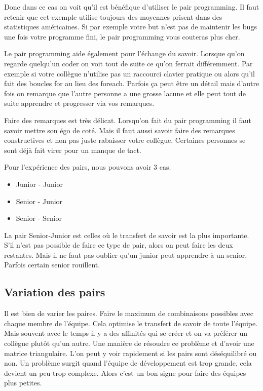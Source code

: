 \documentclass[journal, a4paper, frenchb]{IEEEtran}
\begin{document}
Donc dans ce cas on voit qu’il est bénéfique d’utiliser le pair programming. Il faut retenir que cet exemple utilise toujours des moyennes prisent dans des statistiques américaines. Si par exemple votre but n’est pas de maintenir les bugs une fois votre programme fini, le pair programming vous couteras plus cher.

Le pair programming aide également pour l’échange du savoir. Lorsque qu’on regarde quelqu’un coder on voit tout de suite ce qu’on ferrait différemment. Par exemple si votre collègue n’utilise pas un raccourci clavier pratique ou alors qu’il fait des boucles for au lieu des foreach. Parfois ça peut être un détail mais d’autre fois on remarque que l’autre personne a une grosse lacune et elle peut tout de suite apprendre et progresser via vos remarques.

Faire des remarques est très délicat. Lorsqu’on fait du pair programming il faut savoir mettre son égo de coté. Mais il faut aussi savoir faire des remarques constructives et non pas juste rabaisser votre collègue. Certaines personnes se sont déjà fait virer pour un manque de tact.

Pour l’expérience des pairs, nous pouvons avoir 3 cas.

\begin{itemize}
  \item Junior - Junior
  \item Senior - Junior
  \item Senior - Senior
\end{itemize}

La pair Senior-Junior est celles où le transfert de savoir est la plus importante. S’il n’est pas possible de faire ce type de pair, alors on peut faire les deux restantes. Mais il ne faut pas oublier qu’un junior peut apprendre à un senior. Parfois certain senior rouillent.

\subsection{Variation des pairs}

Il est bien de varier les paires. Faire le maximum de combinaisons possibles avec chaque membre de l’équipe. Cela optimise le transfert de savoir de toute l’équipe. Mais souvent avec le temps il y a des affinités qui se créer et on va préférer un collègue plutôt qu’un autre. Une manière de résoudre ce problème et d’avoir une matrice triangulaire. L’on peut y voir rapidement si les pairs sont déséquilibré ou non. Un problème surgit quand l’équipe de développement est trop grande, cela devient un peu trop complexe. Alors c’est un bon signe pour faire des équipes plus petites.
\end{document}

